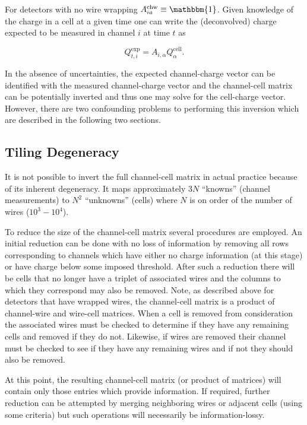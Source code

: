 \documentclass[letter]{article}
\def\mQexp{Q^{\mathrm{exp}}_{t,i}}
\def\mAchc{A_{i,\alpha}}
\def\mAchw{A^{\mathrm{chw}}_{ia}}
\def\mQcell{Q^{\mathrm{cell}}_\alpha}
\begin{document}
For detectors with no wire wrapping $\mAchw \equiv \mathbbm{1}$.
Given knowledge of the charge in a cell at a given time one can write
the (deconvolved) charge expected to be measured in channel $i$ at
time $t$ as

\begin{equation}
  \label{eq:Qexp}
  \mQexp = \mAchc \mQcell.
\end{equation}

In the absence of uncertainties, the expected channel-charge vector
can be identified with the measured channel-charge vector and the
channel-cell matrix can be potentially inverted and thus one may solve
for the cell-charge vector.
However, there are two confounding problems to performing this
inversion which are described in the following two sections.


\subsection{Tiling Degeneracy}

It is not possible to invert the full channel-cell matrix in
actual practice because of its inherent degeneracy.
It maps approximately $3N$ ``knowns'' (channel measurements) to $N^2$
``unknowns'' (cells) where $N$ is on order of the number of wires
($10^3-10^4$).

To reduce the size of the channel-cell matrix several procedures are
employed.
An initial reduction can be done with no loss of information by
removing all rows corresponding to channels which have either no
charge information (at this stage) or have charge below some imposed
threshold.
After such a reduction there will be cells that no longer have a
triplet of associated wires and the columns to which they correspond
may also be removed.
Note, as described above for detectors that have wrapped wires, the
channel-cell matrix is a product of channel-wire and wire-cell matrices.
When a cell is removed from consideration the associated wires must be
checked to determine if they have any remaining cells and removed if
they do not.
Likewise, if wires are removed their channel must be checked to see if
they have any remaining wires and if not they should also be removed.

At this point, the resulting channel-cell matrix (or product of
matrices) will contain only those entries which provide information.
If required, further reduction can be attempted by merging neighboring
wires or adjacent cells (using some criteria) but such operations will
necessarily be information-lossy.
\end{document}
